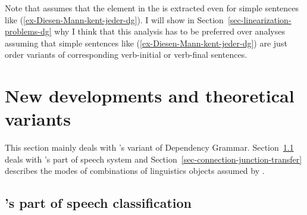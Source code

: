 Note that \citet[]{Hudson97a} assumes that the element in the \vf is extracted even for simple
sentences like (\ref{ex-Diesen-Mann-kent-jeder-dg}). I will show in Section~\ref{sec-linearization-problems-dg} why I think that
this analysis has to be preferred over analyses assuming that simple sentences like
(\ref{ex-Diesen-Mann-kent-jeder-dg}) are just order variants of corresponding verb-initial or
verb-final sentences.%

\section{New developments and theoretical variants}

This section mainly deals with \tes's variant of Dependency Grammar. Section~\ref{sec-tesniere-pos}
deals with \tes's part of speech system and Section~\ref{sec-connection-junction-transfer} describes the modes of combinations of
linguistics objects assumed by \tes.

\subsection{\tes's part of speech classification}
\label{sec-tesniere-pos}


